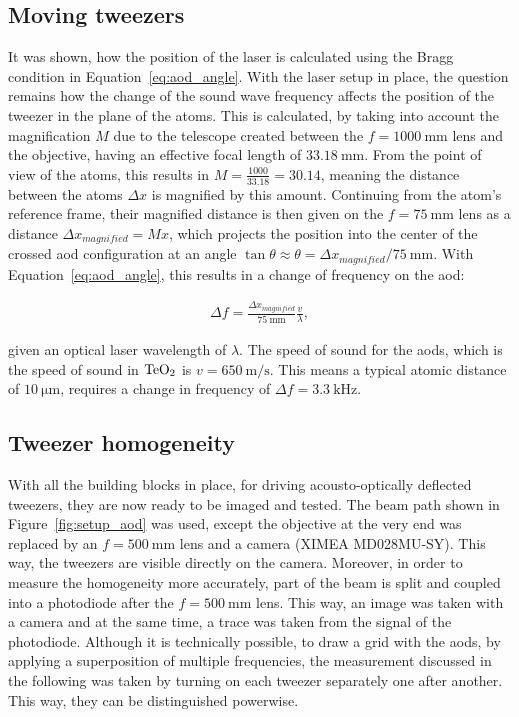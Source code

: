\subsection{Moving tweezers}%
\label{sec:moving_tweezers}

It was shown, how the position of the laser is calculated using the Bragg condition in Equation~\ref{eq:aod_angle}. With the laser setup in place, the question remains how the change of the sound wave frequency affects the position of the tweezer in the plane of the atoms. This is calculated, by taking into account the magnification $M$ due to the telescope created between the $f=\SI{1000}{\milli\meter}$ lens and the objective, having an effective focal length of $\SI{33.18}{\milli\meter}$. From the point of view of the atoms, this results in $M=\frac{1000}{33.18} = 30.14$, meaning the distance between the atoms $\Delta x$ is magnified by this amount. Continuing from the atom's reference frame, their magnified distance is then given on the $f=\SI{75}{\milli\meter}$ lens as a distance $\Delta x_{magnified} = Mx$, which projects the position into the center of the crossed \ac{aod} configuration at an angle $\tan{\theta} \approx \theta = \Delta x_{magnified} / \SI{75}{\milli\meter}$.
With Equation~\ref{eq:aod_angle}, this results in a change of frequency on the \ac{aod}:

\begin{align}
	\Delta f = \frac{\Delta x_{magnified}}{\SI{75}{\milli\meter}} \frac{v}{\lambda},
\end{align}

given an optical laser wavelength of $\lambda$. The speed of sound for the \acp{aod}, which is the speed of sound in $\ce{TeO2}$ is $v=\SI{650}{\meter\per\second}$. This means a typical atomic distance of $\SI{10}{\micro\meter}$, requires a change in frequency of $\Delta f = \SI{3.3}{\kilo\hertz}$.

\subsection{Tweezer homogeneity}

With all the building blocks in place, for driving acousto-optically deflected tweezers, they are now ready to be imaged and tested. The beam path shown in Figure~\ref{fig:setup_aod} was used, except the objective at the very end was replaced by an $f=\SI{500}{\milli\meter}$ lens and a camera (XIMEA MD028MU-SY). This way, the tweezers are visible directly on the camera. Moreover, in order to measure the homogeneity more accurately, part of the beam is split and coupled into a photodiode after the $f=\SI{500}{\milli\meter}$ lens. This way, an image was taken with a camera and at the same time, a trace was taken from the signal of the photodiode. Although it is technically possible, to draw a grid with the \acp{aod}, by applying a superposition of multiple frequencies, the measurement discussed in the following was taken by turning on each tweezer separately one after another. This way, they can be distinguished powerwise.

